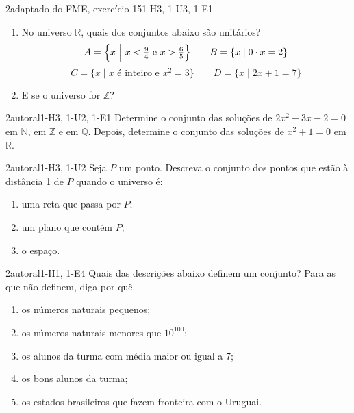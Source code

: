 \begin{questao}{2}{adaptado do FME, exercício 15}{1-H3, 1-U3, 1-E1}\label{u1:unitarios}
\begin{enumerate}[label=\alph*)]
  \item No universo $\mathbb{R}$, quais dos conjuntos abaixo são unitários?
\[
A=\Bigl\{x\ \Big|\ x<\tfrac94\text{ e }x>\tfrac65\Bigr\}\qquad B=\{x\mid 0\cdot x=2\}
\]
\[
C=\{x\mid x\text{ é inteiro e }x^2=3\}\qquad D=\{x\mid 2x+1=7\}
\]
  \item E se o universo for $\mathbb{Z}$?
\end{enumerate}
\end{questao}

\begin{questao}[integradora]{2}{autoral}{1-H3, 1-U2, 1-E1}\label{u1:equacao}
Determine o conjunto das soluções de $2x^2-3x-2=0$ em $\mathbb{N}$, em $\mathbb{Z}$ e em $\mathbb{Q}$. Depois, determine o conjunto das soluções de $x^2+1=0$ em $\mathbb{R}$.
\end{questao}

\begin{questao}{2}{autoral}{1-H3, 1-U2}\label{u1:distancia}
Seja $P$ um ponto. Descreva o conjunto dos pontos que estão à distância 1 de $P$ quando o universo é:
\begin{enumerate}[label=\alph*)]
  \item uma reta que passa por $P$;
  \item um plano que contém $P$;
  \item o espaço.
\end{enumerate}
\end{questao}

\begin{questao}{2}{autoral}{1-H1, 1-E4}\label{u1:criterio}
Quais das descrições abaixo definem um conjunto? Para as que não definem, diga por quê.
\begin{enumerate}[label=\alph*)]
  \item os números naturais pequenos;
  \item os números naturais menores que $10^{100}$;
  \item os alunos da turma com média maior ou igual a 7;
  \item os bons alunos da turma;
  \item os estados brasileiros que fazem fronteira com o Uruguai.
\end{enumerate}
\end{questao}

